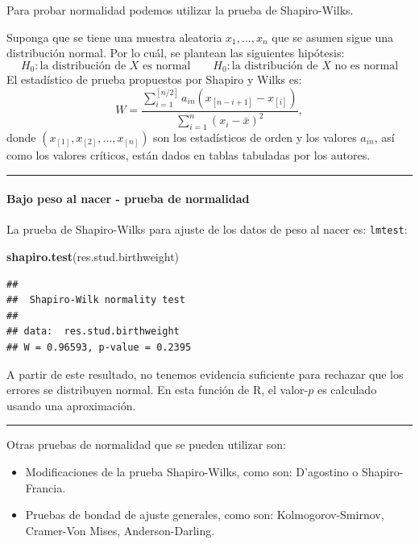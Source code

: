 \documentclass[
]{article}
\newenvironment{Shaded}{\begin{snugshade}}{\end{snugshade}}
\newcommand{\FunctionTok}[1]{\textcolor[rgb]{0.13,0.29,0.53}{\textbf{#1}}}
\newcommand{\NormalTok}[1]{#1}
\providecommand{\tightlist}{%
  \setlength{\itemsep}{0pt}\setlength{\parskip}{0pt}}
\begin{document}
Para probar normalidad podemos utilizar la prueba de Shapiro-Wilks.

Suponga que se tiene una muestra aleatoria \(x_{1},\ldots,x_{n}\) que se asumen sigue una distribución normal. Por lo cuál, se plantean las siguientes hipótesis:
\[
H_{0}: \mbox{la distribución de }X \mbox{ es normal} \qquad H_{0}: \mbox{la distribución de }X \mbox{ no es normal}
\]
El estadístico de prueba propuestos por Shapiro y Wilks es:
\[
W = \frac{ \sum_{i=1}^{[n/2]}a_{in}\left(x_{[n-i+1]}-x_{[i]}\right)  }{\sum_{i=1}^{n}(x_{i}-\bar{x})^{2}},
\]
donde \((x_{[1]},x_{[2]},\ldots,x_{[n]})\) son los estadísticos de orden y los valores \(a_{in}\), así como los valores críticos, están dados en tablas tabuladas por los autores.

\rule{\textwidth}{0.4pt}

\hypertarget{bajo-peso-al-nacer---prueba-de-normalidad}{%
\paragraph*{Bajo peso al nacer - prueba de normalidad}\label{bajo-peso-al-nacer---prueba-de-normalidad}}

La prueba de Shapiro-Wilks para ajuste de los datos de peso al nacer es:
\texttt{lmtest}:

\begin{Shaded}
\begin{Highlighting}[]
\FunctionTok{shapiro.test}\NormalTok{(res.stud.birthweight)}
\end{Highlighting}
\end{Shaded}

\begin{verbatim}
## 
##  Shapiro-Wilk normality test
## 
## data:  res.stud.birthweight
## W = 0.96593, p-value = 0.2395
\end{verbatim}

A partir de este resultado, no tenemos evidencia suficiente para rechazar que los errores se distribuyen normal. En esta función de R, el valor-\(p\) es calculado usando una aproximación.

\rule{\textwidth}{0.4pt}

Otras pruebas de normalidad que se pueden utilizar son:

\begin{itemize}
\tightlist
\item
  Modificaciones de la prueba Shapiro-Wilks, como son: D'agostino o Shapiro-Francia.
\item
  Pruebas de bondad de ajuste generales, como son: Kolmogorov-Smirnov, Cramer-Von Mises, Anderson-Darling.
\end{itemize}
\end{document}
